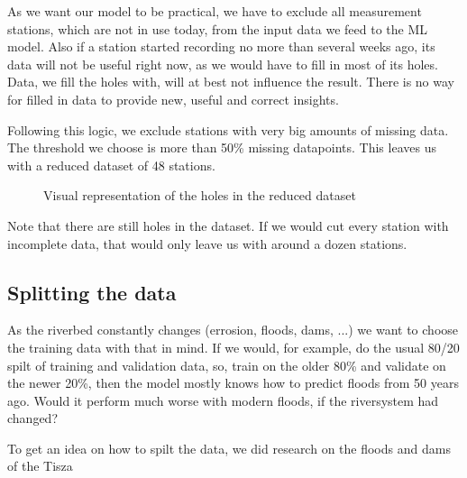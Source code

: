 \documentclass{article}
\newcommand{\textdots}{...}
\begin{document}
As we want our model to be practical, we have to exclude all measurement
stations, which are not in use today, from the input data we feed to the ML
model. Also if a station started recording no more than several weeks ago, its
data will not be useful right now, as we would have to fill in most of its
holes. Data, we fill the holes with, will at best not influence the result.
There is no way for filled in data to provide new, useful and correct
insights.

Following this logic, we exclude stations with very big amounts of missing
data. The threshold we choose is more than 50\% missing datapoints. This
leaves us with a reduced dataset of 48 stations.

\begin{figure}[h]
  \caption{Visual representation of the holes in the reduced dataset}
\end{figure}

Note that there are still holes in the dataset. If we would cut every station
with incomplete data, that would only leave us with around a dozen stations.

\subsection{Splitting the data}

As the riverbed constantly changes (errosion, floods, dams, {\textdots}) we
want to choose the training data with that in mind. If we would, for example,
do the usual 80/20 spilt of training and validation data, so, train on the
older 80\% and validate on the newer 20\%, then the model mostly knows how to
predict floods from 50 years ago. Would it perform much worse with modern
floods, if the riversystem had changed?

To get an idea on how to spilt the data, we did research on the floods and
dams of the Tisza
\end{document}
